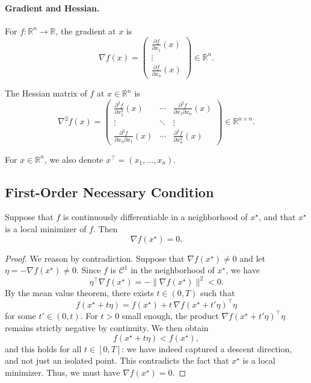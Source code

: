 \paragraph{Gradient and Hessian.}

For $f : \mathbb{R}^n \to \mathbb{R}$, the gradient at $x$ is
\[
\nabla f(x) =
\begin{pmatrix}
\displaystyle \frac{\partial f}{\partial x_1}(x)\\[0.3em]
\vdots\\[0.3em]
\displaystyle \frac{\partial f}{\partial x_n}(x)
\end{pmatrix}
\in \mathbb{R}^n.
\]

The Hessian matrix of $f$ at $x \in \mathbb{R}^n$ is
\[
\nabla^2 f(x) =
\begin{pmatrix}
\frac{\partial^2 f}{\partial x_1^2}(x) &
\cdots &
\frac{\partial^2 f}{\partial x_1 \partial x_n}(x)\\
\vdots & \ddots & \vdots \\
\frac{\partial^2 f}{\partial x_n \partial x_1}(x) &
\cdots &
\frac{\partial^2 f}{\partial x_n^2}(x)
\end{pmatrix}
\in \mathbb{R}^{n \times n}.
\]

For $x \in \mathbb{R}^n$, we also denote $x^\top = (x_1,\dots,x_n)$.

\subsection{First-Order Necessary Condition}
\label{subsec:2.2.2}

\begin{theoreme}
\label{thm:first-order}
Suppose that $f$ is continuously differentiable in a neighborhood of $x^\star$, and
that $x^\star$ is a local minimizer of $f$. Then
\begin{equation}
    \nabla f(x^\star) = 0.
\end{equation}
\end{theoreme}

\begin{proof}
We reason by contradiction. Suppose that $\nabla f(x^\star) \neq 0$ and let
$\eta = -\nabla f(x^\star) \neq 0$. Since $f$ is $\mathcal{C}^1$ in the neighborhood of
$x^\star$, we have
\[
    \eta^\top \nabla f(x^\star) = -\|\nabla f(x^\star)\|^2 < 0.
\]
By the mean value theorem, there exists $t \in (0,T)$ such that
\[
    f(x^\star + t\eta) = f(x^\star) + t\,\nabla f(x^\star + t'\eta)^\top \eta
\]
for some $t' \in (0,t)$. For $t>0$ small enough, the product
$\nabla f(x^\star + t'\eta)^\top \eta$ remains strictly negative by continuity.
We then obtain
\[
    f(x^\star + t\eta) < f(x^\star),
\]
and this holds for all $t \in [0,T]$: we have indeed captured a descent direction, and not just an isolated point. This contradicts the fact that $x^\star$ is a local minimizer. Thus, we must have
$\nabla f(x^\star) = 0$.
\end{proof}

